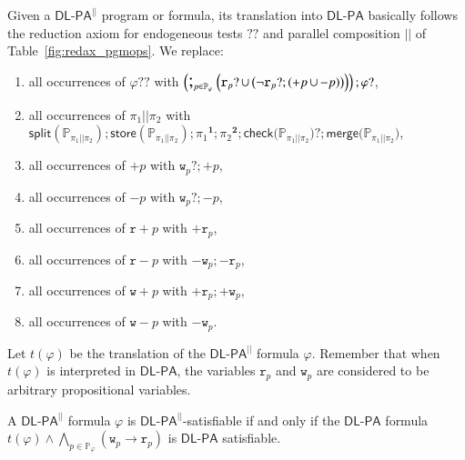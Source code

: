 \documentclass{llncs}
\newcommand{\progStore}{\mathsf{store}}
\newcommand{\progOkChange}{\mathsf{check}}
\newcommand{\progsplit}{\mathsf{split}}
\newcommand{\progmerge}{\mathsf{merge}}
\newcommand{\cp}[2]{{#2}^\mathbf{#1}}
\newcommand{\pll}{ {||} }							%
\newcommand{\readOf}[1]{\mathbb{R}_{#1}}
\newcommand{\readable}[1]{\mathtt{r}_{#1}}
\newcommand{\readset}{\mathsf{Rd}}
\newcommand{\valuset}{\mathsf{V}}
\newcommand{\writable}[1]{\mathtt{w}_{#1}}
\newcommand{\writeset}{\mathsf{Wr}}
\newcommand{\testendo}{?\!\!?}			%
\newcommand{\testpdl}{?}				%
\newcommand{\writeOf}[1]{\mathbb{W}_{#1}}
\newcommand{\Dlpa}{\ensuremath{\mathsf{DL\text{-}PA}}\xspace}
\newcommand{\DlpaPll}{\ensuremath{\mathsf{DL\text{-}PA}^\pll}\xspace}
\newcommand{\assgntop}[1]{{\mathtt {+} #1}}
\newcommand{\assgnbot}[1]{{\mathtt {-} #1}}
\newcommand{\assgntopR}[1]{{\mathtt r {+} #1}}
\newcommand{\assgnbotR}[1]{{\mathtt r {-} #1}}
\newcommand{\assgntopW}[1]{{\mathtt w {+} #1}}
\newcommand{\assgnbotW}[1]{{\mathtt w {-} #1}}
\newcommand{\assgntopV}[1]{{\mathtt {+} #1}}
\newcommand{\assgnbotV}[1]{{\mathtt {-} #1}}
\newcommand{\intPgm}[1]{\llbracket #1 \rrbracket}
\newcommand{\limp}{ \rightarrow }
\newcommand{\ndet}{\,{\cup}\,}
\renewcommand{\phi}{\varphi}
\newcommand{\propset}{\mathbb P}
\newcommand{\propsetOf}[1]{\propset_{#1}}
\newcommand{\seqseq}[1]{ \text{\Large ;}_{#1} ~ }
\newcommand{\tuple}[1]{ \langle #1 \rangle}
\begin{document}
Given a \DlpaPll program or formula, its translation into \Dlpa basically follows the reduction axiom for endogeneous tests $\testendo$ and parallel composition $ \pll $ of Table~\ref{fig:redax_pgmops}. 
We replace:
\begin{enumerate}
\item
all occurrences of $\phi \testendo $ with 
$\left(\seqseq{p \in \propsetOf \phi} \Big(
\readable{p} \testpdl \ndet \big( \lnot \readable{p} \testpdl ; (\assgntopV{p} \ndet \assgnbotV{p}) \big) 
\Big)\right) ; \phi \testpdl $,
\item
all occurrences of $ \pi_1 \pll \pi_2 $ with
$\progsplit( \propsetOf{\pi_1 \pll \pi_2} ) ; 
\progStore( \propsetOf{\pi_1 \pll \pi_2} ) ; 
\cp 1 {\pi_1} ; \cp 2 {\pi_2} ; 
\progOkChange \big(\propsetOf{\pi_1 \pll \pi_2} \big) \testpdl ;
\progmerge \big(\propsetOf{\pi_1 \pll \pi_2} \big) $,
\item
all occurrences of $\assgntopV p$ with $\writable p ? ; \assgntopV p$,
\item
all occurrences of $\assgnbotV p$ with $\writable p ? ; \assgnbotV p$,
\item
all occurrences of $\assgntopR{p}$ with $\assgntop{ \readable{p}}$,
\item
all occurrences of $\assgnbotR{p}$ with $\assgnbot{ \writable{p}} ; \assgnbot{ \readable{p}}$,
\item
all occurrences of $\assgntopW{p}$ with $\assgntop{ \readable{p}} ; \assgntop{ \writable{p}}$,
\item
all occurrences of $\assgnbotW{p}$ with $\assgnbot{ \writable{p}}$.
\end{enumerate}
Let %
$t(\phi)$ be the translation of the \DlpaPll formula $\phi$.
Remember that when $t(\phi)$ is interpreted in \Dlpa, the variables $\readable p$ and $\writable{p}$ 
are considered to be arbitrary propositional variables. 

\begin{theorem}
A \DlpaPll formula $\phi$ is \DlpaPll-satisfiable if and only if the \Dlpa formula
$t(\phi) \land \bigwedge_{p \in \propsetOf \phi } (\writable{p} \limp \readable p)$ 
is \Dlpa satisfiable.
\end{theorem}
\end{document}
